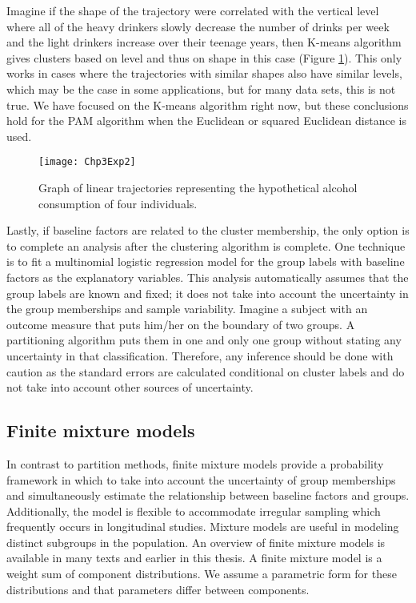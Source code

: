 Imagine if the shape of the trajectory were correlated with the vertical level where all of the heavy drinkers slowly decrease the number of drinks per week and the light drinkers increase over their teenage years, then K-means algorithm gives clusters based on level and thus on shape in this case (Figure \ref{fig:3-2}). This only works in cases where the trajectories with similar shapes also have similar levels, which may be the case in some applications, but for many data sets, this is not true. We have focused on the K-means algorithm right now, but these conclusions hold for the PAM algorithm when the Euclidean or squared Euclidean distance is used.
\begin{figure}
\begin{center}
\texttt{[image: Chp3Exp2]}
\end{center}
\caption{Graph of linear trajectories representing the hypothetical alcohol consumption of four individuals.}
\label{fig:3-2} 
\end{figure}

Lastly, if baseline factors are related to the cluster membership, the only option is to complete an analysis after the clustering algorithm is complete. One technique is to fit a multinomial logistic regression model for the group labels with baseline factors as the explanatory variables. This analysis automatically assumes that the group labels are known and fixed; it does not take into account the uncertainty in the group memberships and sample variability. Imagine a subject with an outcome measure that puts him/her on the boundary of two groups. A partitioning algorithm puts them in one and only one group without stating any uncertainty in that classification. Therefore, any inference should be done with caution as the standard errors are calculated conditional on cluster labels and do not take into account other sources of uncertainty.

\subsection{Finite mixture models}
In contrast to partition methods, finite mixture models provide a probability framework in which to take into account the uncertainty of group memberships and simultaneously estimate the relationship between baseline factors and groups. Additionally, the model is flexible to accommodate irregular sampling which frequently occurs in longitudinal studies. Mixture models are useful in modeling distinct subgroups in the population. An overview of finite mixture models is available in many texts \cite{everitt1981,mclachlan1988,mclachlan2000} and earlier in this thesis. A finite mixture model is a weight sum of component distributions. We assume a parametric form for these distributions and that parameters differ between components.

